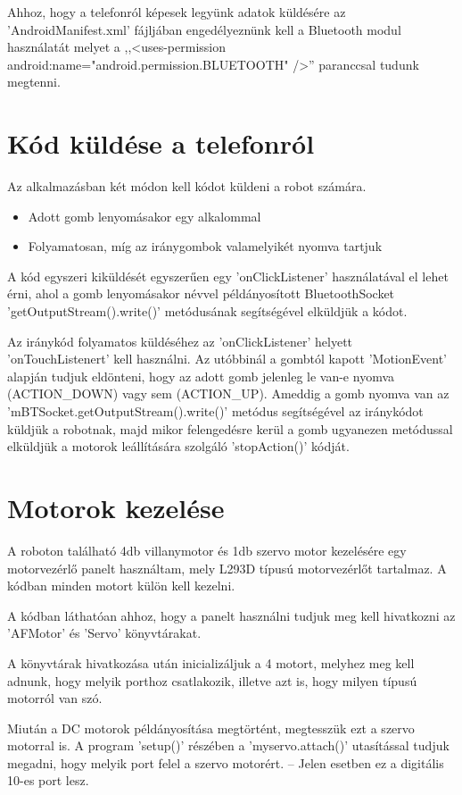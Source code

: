 \documentclass[]{thesis-ekf}
\theoremstyle{definition}
\begin{document}
Ahhoz, hogy a telefonról képesek legyünk adatok küldésére az 'AndroidManifest.xml' fájljában engedélyeznünk kell a Bluetooth modul használatát melyet a ,,<uses-permission android:name="android.permission.BLUETOOTH" />'' paranccsal tudunk megtenni.
\section{Kód küldése a telefonról}
Az alkalmazásban két módon kell kódot küldeni a robot számára.
\begin{itemize}
	\item Adott gomb lenyomásakor egy alkalommal
	\item Folyamatosan, míg az iránygombok valamelyikét nyomva tartjuk
\end{itemize}

A kód egyszeri kiküldését egyszerűen egy 'onClickListener' használatával el lehet érni, ahol a gomb lenyomásakor  névvel példányosított BluetoothSocket 'getOutputStream().write()' metódusának segítségével elküldjük a kódot.

Az iránykód folyamatos küldéséhez az 'onClickListener' helyett 'onTouchListenert' kell használni. Az utóbbinál a gombtól kapott 'MotionEvent' alapján tudjuk eldönteni, hogy az adott gomb jelenleg le van-e nyomva (ACTION\_DOWN) vagy sem (ACTION\_UP). Ameddig a gomb nyomva van az 'mBTSocket.getOutputStream().write()' metódus segítségével az iránykódot küldjük a robotnak, majd mikor felengedésre kerül a gomb ugyanezen metódussal elküldjük a motorok leállítására szolgáló 'stopAction()' kódját.
\section{Motorok kezelése}
A roboton található 4db villanymotor és 1db szervo motor kezelésére egy motorvezérlő panelt használtam, mely L293D típusú motorvezérlőt tartalmaz. A kódban minden motort külön kell kezelni.


A kódban láthatóan ahhoz, hogy a panelt használni tudjuk meg kell hivatkozni az 'AFMotor' és 'Servo' könyvtárakat.

A könyvtárak hivatkozása után inicializáljuk a 4 motort, melyhez meg kell adnunk, hogy melyik porthoz csatlakozik, illetve azt is, hogy milyen típusú motorról van szó.

Miután a DC motorok példányosítása megtörtént, megtesszük ezt a szervo motorral is. A program 'setup()' részében a 'myservo.attach()' utasítással tudjuk megadni, hogy melyik port felel a szervo motorért. -- Jelen esetben ez a digitális 10-es port lesz.
\end{document}
